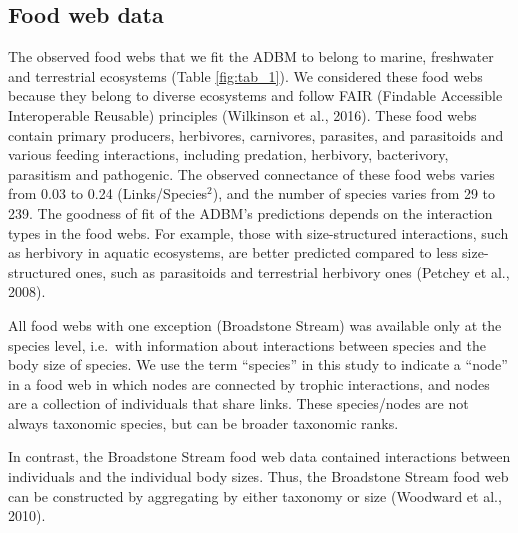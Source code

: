 \documentclass{article}
\begin{document}
\hypertarget{food-web-data}{%
\subsection{Food web data}\label{food-web-data}}

The observed food webs that we fit the ADBM to belong to marine,
freshwater and terrestrial ecosystems (Table \ref{fig:tab_1}). We
considered these food webs because they belong to diverse ecosystems and
follow FAIR (Findable Accessible Interoperable Reusable) principles
(Wilkinson et al., 2016). These food webs contain primary producers,
herbivores, carnivores, parasites, and parasitoids and various feeding
interactions, including predation, herbivory, bacterivory, parasitism
and pathogenic. The observed connectance of these food webs varies from
0.03 to 0.24 (Links/Species\(^2\)), and the number of species varies
from 29 to 239. The goodness of fit of the ADBM's predictions depends on
the interaction types in the food webs. For example, those with
size-structured interactions, such as herbivory in aquatic ecosystems,
are better predicted compared to less size-structured ones, such as
parasitoids and terrestrial herbivory ones (Petchey et al., 2008).

All food webs with one exception (Broadstone Stream) was available only
at the species level, i.e.~with information about interactions between
species and the body size of species. We use the term ``species'' in
this study to indicate a ``node'' in a food web in which nodes are
connected by trophic interactions, and nodes are a collection of
individuals that share links. These species/nodes are not always
taxonomic species, but can be broader taxonomic ranks.

In contrast, the Broadstone Stream food web data contained interactions
between individuals and the individual body sizes. Thus, the Broadstone
Stream food web can be constructed by aggregating by either taxonomy or
size (Woodward et al., 2010).
\end{document}
